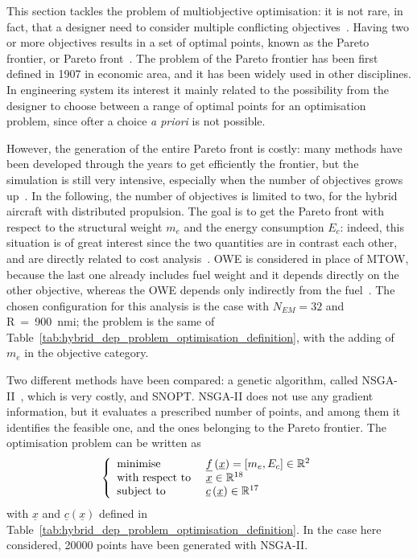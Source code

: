 This section tackles the problem of multiobjective optimisation: it is not rare, in fact, that a designer need to consider multiple conflicting objectives~\cite{bib:miettinen_2008}.
Having two or more objectives results in a set of optimal points, known as the Pareto frontier, or Pareto front~\cite{bib:pareto}.
The problem of the Pareto frontier has been first defined in 1907 in economic area, and it has been widely used in other disciplines. 
In engineering system its interest it mainly related to the possibility from the designer to choose between a range of optimal points for an optimisation problem, since ofter a choice \textit{a priori} is not possible. 

However, the generation of the entire Pareto front is costly: many methods have been developed through the years to get efficiently the frontier, but the simulation is still very intensive, especially when the number of objectives grows up~\cite{bib:marler, bib:chircop}. 
In the following, the number of objectives is limited to two, for the hybrid aircraft with distributed propulsion. 
The goal is to get the Pareto front with respect to the structural weight $m_e$ and the energy consumption $E_c$: indeed, this situation is of great interest since the two quantities are in contrast each other, and are directly related to cost analysis~\cite{bib:roskam_partVIII}. 
OWE is considered in place of MTOW, because the last one already includes fuel weight and it depends directly on the other objective, whereas the OWE depends only indirectly from the fuel~\cite{bib:schmollgruber_phd}. 
The chosen configuration for this analysis is the case with $N_{EM}=32$ and R~=~900~nmi; the problem is the same of Table~\ref{tab:hybrid_dep_problem_optimisation_definition}, with the adding of $m_e$ in the objective category. 

Two different methods have been compared: a genetic algorithm, called NSGA-II~\cite{bib:nsga2}, which is very costly, and SNOPT. 
NSGA-II does not use any gradient information, but it evaluates a prescribed number of points, and among them it identifies the feasible one, and the ones belonging to the Pareto frontier. 
The optimisation problem can be written as
\begin{equation*}
	\left\{\begin{array}{l l}
		\textrm{minimise } & \underline{f}\left(\underline{x}\right)=\left[m_e, E_c\right]\in\mathbb{R}^{2} \\
		\textrm{with respect to } & \underline{x}\in\mathbb{R}^{18} \\
		\textrm{subject to } & \underline{c}\left(\underline{x}\right)\in\mathbb{R}^{17} \\						 
	\end{array}\right.
\end{equation*}
with $\underline{x}$ and $\underline{c}\left(\underline{x}\right)$ defined in Table~\ref{tab:hybrid_dep_problem_optimisation_definition}. 
In the case here considered, 20000 points have been generated with NSGA-II. 

